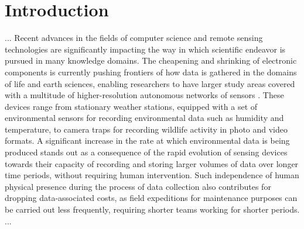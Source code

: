 \documentclass[a4paper]{article}
\begin{document}
\section{Introduction}






...
Recent advances in the fields of computer science and remote sensing technologies are significantly impacting the way in which scientific endeavor is pursued in many knowledge domains. 
The cheapening and shrinking of electronic components is currently pushing frontiers of how data is gathered in the domains of life and earth sciences, enabling researchers to have larger study areas covered with a multitude of higher-resolution autonomous networks of sensors \cite{Lehning2009}. 
These devices range from stationary weather stations, equipped with a set of environmental sensors for recording environmental data such as humidity and temperature, to camera traps for recording wildlife activity in photo and video formats.  
A significant increase in the rate at which environmental data is being produced stands out as a consequence of the rapid evolution of sensing devices towards their capacity of recording and storing larger volumes of data over longer time periods, without requiring human intervention. 
Such independence of human physical presence during the process of data collection also contributes for dropping data-associated costs, as field expeditions for maintenance purposes can be carried out less frequently, requiring shorter teams working for shorter periods.
...
\end{document}
